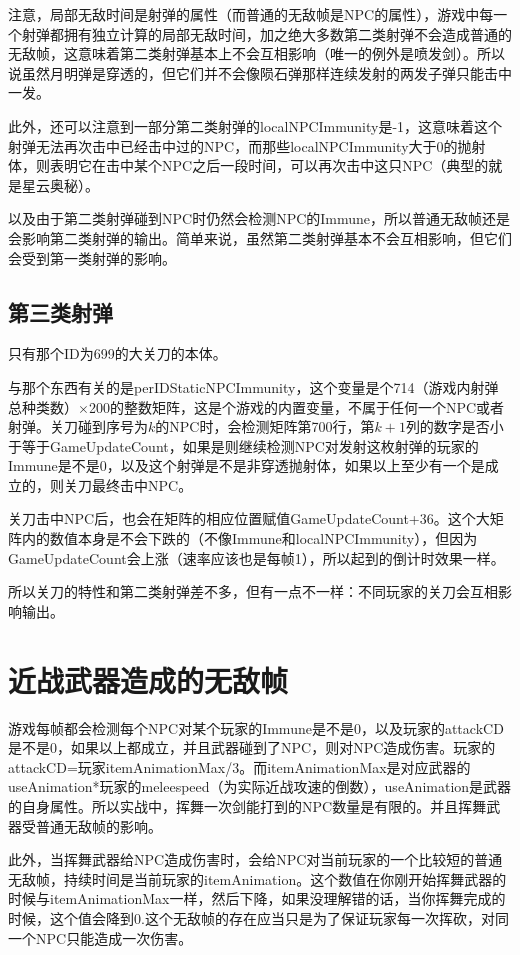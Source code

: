 注意，局部无敌时间是射弹的属性（而普通的无敌帧是NPC的属性），游戏中每一个射弹都拥有独立计算的局部无敌时间，加之绝大多数第二类射弹不会造成普通的无敌帧，这意味着第二类射弹基本上不会互相影响（唯一的例外是喷发剑）。所以说虽然月明弹是穿透的，但它们并不会像陨石弹那样连续发射的两发子弹只能击中一发。

此外，还可以注意到一部分第二类射弹的localNPCImmunity是-1，这意味着这个射弹无法再次击中已经击中过的NPC，而那些localNPCImmunity大于0的抛射体，则表明它在击中某个NPC之后一段时间，可以再次击中这只NPC（典型的就是星云奥秘）。

以及由于第二类射弹碰到NPC时仍然会检测NPC的Immune，所以普通无敌帧还是会影响第二类射弹的输出。简单来说，虽然第二类射弹基本不会互相影响，但它们会受到第一类射弹的影响。

\subsection{第三类射弹}
只有那个ID为699的大关刀的本体。

与那个东西有关的是perIDStaticNPCImmunity，这个变量是个714（游戏内射弹总种类数）$\times$200的整数矩阵，这是个游戏的内置变量，不属于任何一个NPC或者射弹。关刀碰到序号为$k$的NPC时，会检测矩阵第700行，第$k+1$列的数字是否小于等于GameUpdateCount，如果是则继续检测NPC对发射这枚射弹的玩家的Immune是不是0，以及这个射弹是不是非穿透抛射体，如果以上至少有一个是成立的，则关刀最终击中NPC。

关刀击中NPC后，也会在矩阵的相应位置赋值GameUpdateCount+36。这个大矩阵内的数值本身是不会下跌的（不像Immune和localNPCImmunity），但因为GameUpdateCount会上涨（速率应该也是每帧1），所以起到的倒计时效果一样。

所以关刀的特性和第二类射弹差不多，但有一点不一样：不同玩家的关刀会互相影响输出。

\section{近战武器造成的无敌帧}
游戏每帧都会检测每个NPC对某个玩家的Immune是不是0，以及玩家的attackCD是不是0，如果以上都成立，并且武器碰到了NPC，则对NPC造成伤害。玩家的attackCD=玩家itemAnimationMax/3。而itemAnimationMax是对应武器的useAnimation*玩家的meleespeed（为实际近战攻速的倒数），useAnimation是武器的自身属性。所以实战中，挥舞一次剑能打到的NPC数量是有限的。并且挥舞武器受普通无敌帧的影响。

此外，当挥舞武器给NPC造成伤害时，会给NPC对当前玩家的一个比较短的普通无敌帧，持续时间是当前玩家的itemAnimation。这个数值在你刚开始挥舞武器的时候与itemAnimationMax一样，然后下降，如果没理解错的话，当你挥舞完成的时候，这个值会降到0.这个无敌帧的存在应当只是为了保证玩家每一次挥砍，对同一个NPC只能造成一次伤害。

